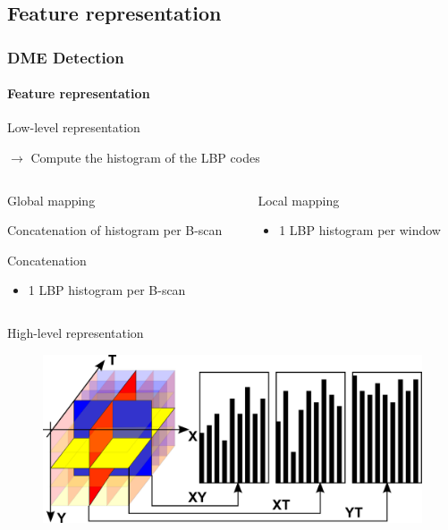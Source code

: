 \documentclass{beamer}
\begin{document}
\subsection{Feature representation}

\begin{frame}
  \frametitle{DME Detection}
  \framesubtitle{Feature representation}
  \begin{block}{Low-level representation}\footnotesize
    \begin{center}
      $\rightarrow$ Compute the histogram of the LBP codes
    \end{center}
    \vspace{-.6cm}
    \begin{columns}
      \begin{column}{.5\linewidth}
        \begin{center}
          Global mapping
        \end{center}
        \begin{description}\footnotesize
          \item[LBP] Concatenation of histogram per B-scan
          \item[LBP-TOP] Concatenation 
        \end{description}
        \begin{itemize}
          \item 1 LBP histogram per B-scan
        \end{itemize}
      \end{column}
      \begin{column}{.5\linewidth}
        \begin{center}
          Local mapping
        \end{center}
        \begin{itemize}
          \item 1 LBP histogram per window
        \end{itemize}
      \end{column}
    \end{columns}
  \end{block}
  \begin{block}{High-level representation}
    \begin{figure}
      \centering
      \includegraphics[width=.4\textwidth]{./images/LBPTOP_fig.png}
    \end{figure}
  \end{block}
\end{frame}
\end{document}
